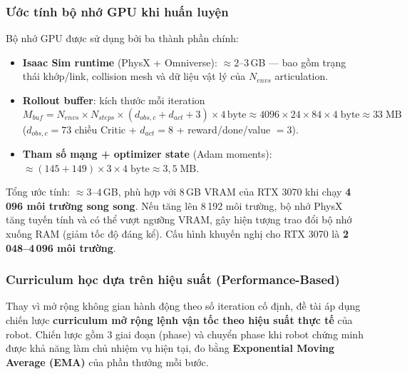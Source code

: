 \subsubsection{Ước tính bộ nhớ GPU khi huấn luyện}

Bộ nhớ GPU được sử dụng bởi ba thành phần chính:
\begin{itemize}
    \item \textbf{Isaac Sim runtime} (PhysX + Omniverse): $\approx 2$--$3$\,GB
    — bao gồm trạng thái khớp/link, collision mesh và dữ liệu vật lý của
    $N_{envs}$ articulation.

    \item \textbf{Rollout buffer}: kích thước mỗi iteration
    \begin{equation*}
        M_{buf} = N_{envs} \times N_{steps} \times (d_{obs,c} + d_{act} + 3)
        \times 4\,\text{byte}
        \approx 4096 \times 24 \times 84 \times 4\;\text{byte}
        \approx 33\;\text{MB}
    \end{equation*}
    ($d_{obs,c} = 73$ chiều Critic + $d_{act} = 8$ + reward/done/value $= 3$).

    \item \textbf{Tham số mạng + optimizer state} (Adam moments):
    $\approx (145 + 149) \times 3 \times 4\;\text{byte} \approx 3{,}5\;\text{MB}$.
\end{itemize}

Tổng ước tính: $\approx 3$--$4$\,GB, phù hợp với 8\,GB VRAM của RTX 3070
khi chạy \textbf{4\,096 môi trường song song}. Nếu tăng lên 8\,192 môi
trường, bộ nhớ PhysX tăng tuyến tính và có thể vượt ngưỡng VRAM,
gây hiện tượng trao đổi bộ nhớ xuống RAM (giảm tốc độ đáng kể).
Cấu hình khuyến nghị cho RTX 3070 là \textbf{2\,048--4\,096 môi trường}.

\subsubsection{Curriculum học dựa trên hiệu suất (Performance-Based)}

Thay vì mở rộng không gian hành động theo số iteration cố định, đề tài
áp dụng chiến lược \textbf{curriculum mở rộng lệnh vận tốc theo hiệu suất
thực tế} của robot. Chiến lược gồm 3 giai đoạn (phase) và chuyển phase khi
robot chứng minh được khả năng làm chủ nhiệm vụ hiện tại, đo bằng
\textbf{Exponential Moving Average (EMA)} của phần thưởng mỗi bước.

